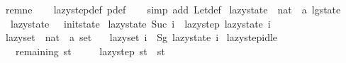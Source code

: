 \begin{isabellebody}
\ rem{\isacharunderscore}{\kern0pt}ne\isanewline
\ \ \isamarkupfalse%
\ lazy{\isacharunderscore}{\kern0pt}step{\isacharunderscore}{\kern0pt}def\ p{\isacharunderscore}{\kern0pt}def\isanewline
\ \ \isamarkupfalse%
\ {\isacharparenleft}{\kern0pt}simp\ add{\isacharcolon}{\kern0pt}\ Let{\isacharunderscore}{\kern0pt}def{\isacharparenright}{\kern0pt}%
\endisatagproof
{\isafoldproof}%
%
\isadelimproof
\isanewline
%
\endisadelimproof
\isanewline
{}\isamarkupfalse%
\ lazy{\isacharunderscore}{\kern0pt}state\ {\isacharcolon}{\kern0pt}{\isacharcolon}{\kern0pt}\ {\isachardoublequoteopen}nat\ {\isasymRightarrow}\ {\isacharprime}{\kern0pt}a\ lg{\isacharunderscore}{\kern0pt}state{\isachardoublequoteclose}\ \isanewline
\ \ {\isachardoublequoteopen}lazy{\isacharunderscore}{\kern0pt}state\ {}\ {\isacharequal}{\kern0pt}\ init{\isacharunderscore}{\kern0pt}state{\isachardoublequoteclose}\isanewline
{\isacharbar}{\kern0pt}\ {\isachardoublequoteopen}lazy{\isacharunderscore}{\kern0pt}state\ {\isacharparenleft}{\kern0pt}Suc\ i{\isacharparenright}{\kern0pt}\ {\isacharequal}{\kern0pt}\ lazy{\isacharunderscore}{\kern0pt}step\ {\isacharparenleft}{\kern0pt}lazy{\isacharunderscore}{\kern0pt}state\ i{\isacharparenright}{\kern0pt}{\isachardoublequoteclose}\isanewline
\isanewline
{}\isamarkupfalse%
\ lazy{\isacharunderscore}{\kern0pt}set\ {\isacharcolon}{\kern0pt}{\isacharcolon}{\kern0pt}\ {\isachardoublequoteopen}nat\ {\isasymRightarrow}\ {\isacharprime}{\kern0pt}a\ set{\isachardoublequoteclose}\ \isanewline
\ \ {\isachardoublequoteopen}lazy{\isacharunderscore}{\kern0pt}set\ i\ {\isacharequal}{\kern0pt}\ Sg\ {\isacharparenleft}{\kern0pt}lazy{\isacharunderscore}{\kern0pt}state\ i{\isacharparenright}{\kern0pt}{\isachardoublequoteclose}%
\isadelimdocument
%
\endisadelimdocument
%
\isatagdocument
%
\isamarkuptrue%
%
\endisatagdocument
{\isafolddocument}%
%
\isadelimdocument
%
\endisadelimdocument
{}\isamarkupfalse%
\ lazy{\isacharunderscore}{\kern0pt}step{\isacharunderscore}{\kern0pt}idle{\isacharcolon}{\kern0pt}\isanewline
\ \ \ {\isachardoublequoteopen}remaining\ st\ {\isacharequal}{\kern0pt}\ {\isacharbraceleft}{\kern0pt}{\isacharbraceright}{\kern0pt}{\isachardoublequoteclose}\isanewline
\ \ \ {\isachardoublequoteopen}lazy{\isacharunderscore}{\kern0pt}step\ st\ {\isacharequal}{\kern0pt}\ st{\isachardoublequoteclose}\isanewline

\end{isabellebody}
